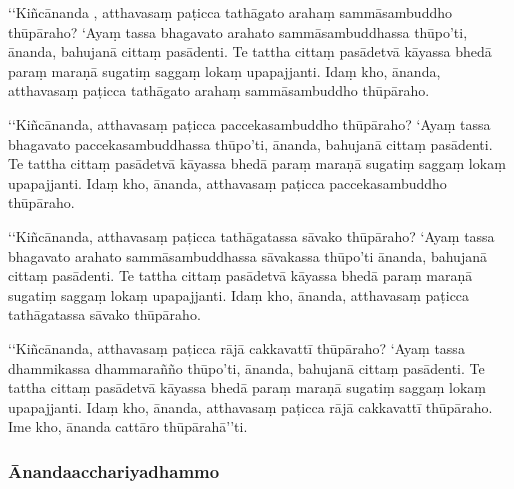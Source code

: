‘‘Kiñcānanda , atthavasaṃ paṭicca tathāgato arahaṃ sammāsambuddho thūpāraho? ‘Ayaṃ tassa bhagavato arahato sammāsambuddhassa thūpo’ti, ānanda, bahujanā cittaṃ pasādenti. Te tattha cittaṃ pasādetvā kāyassa bhedā paraṃ maraṇā sugatiṃ saggaṃ lokaṃ upapajjanti. Idaṃ kho, ānanda, atthavasaṃ paṭicca tathāgato arahaṃ sammāsambuddho thūpāraho.

‘‘Kiñcānanda, atthavasaṃ paṭicca paccekasambuddho thūpāraho? ‘Ayaṃ tassa bhagavato paccekasambuddhassa thūpo’ti, ānanda, bahujanā cittaṃ pasādenti. Te tattha cittaṃ pasādetvā kāyassa bhedā paraṃ maraṇā sugatiṃ saggaṃ lokaṃ upapajjanti. Idaṃ kho, ānanda, atthavasaṃ paṭicca paccekasambuddho thūpāraho.

‘‘Kiñcānanda, atthavasaṃ paṭicca tathāgatassa sāvako thūpāraho? ‘Ayaṃ tassa bhagavato arahato sammāsambuddhassa sāvakassa thūpo’ti ānanda, bahujanā cittaṃ pasādenti. Te tattha cittaṃ pasādetvā kāyassa bhedā paraṃ maraṇā sugatiṃ saggaṃ lokaṃ upapajjanti. Idaṃ kho, ānanda, atthavasaṃ paṭicca tathāgatassa sāvako thūpāraho.

‘‘Kiñcānanda, atthavasaṃ paṭicca rājā cakkavattī thūpāraho? ‘Ayaṃ tassa dhammikassa dhammarañño thūpo’ti, ānanda, bahujanā cittaṃ pasādenti. Te tattha cittaṃ pasādetvā kāyassa bhedā paraṃ maraṇā sugatiṃ saggaṃ lokaṃ upapajjanti. Idaṃ kho, ānanda, atthavasaṃ paṭicca rājā cakkavattī thūpāraho. Ime kho, ānanda cattāro thūpārahā’’ti.

\subsubsection{Ānandaacchariyadhammo}


